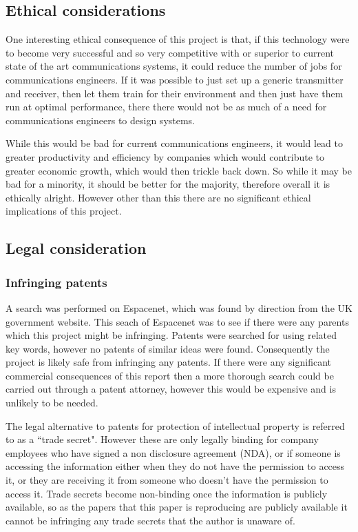 \documentclass[12pt,onecolumn,letterpaper]{article}
\begin{document}
\subsection{Ethical considerations}

One interesting ethical consequence of this project is that, if this technology were to become very successful and so very competitive with or superior to current state of the art communications systems, it could reduce the number of jobs for communications engineers. If it was possible to just set up a generic transmitter and receiver, then let them train for their environment and then just have them run at optimal performance, there there would not be as much of a need for communications engineers to design systems.

While this would be bad for current communications engineers, it would lead to greater productivity and efficiency by companies which would contribute to greater economic growth, which would then trickle back down. So while it may be bad for a minority, it should be better for the majority, therefore overall it is ethically alright. However other than this there are no significant ethical implications of this project.

\subsection{Legal consideration}

\subsubsection{Infringing patents}

A search was performed on Espacenet, which was found by direction from the UK government website. This seach of Espacenet was to see if there were any parents which this project might be infringing. Patents were searched for using related key words, however no patents of similar ideas were found. Consequently the project is likely safe from infringing any patents. If there were any significant commercial consequences of this report then a more thorough search could be carried out through a patent attorney, however this would be expensive and is unlikely to be needed.

The legal alternative to patents for protection of intellectual property is referred to as a ``trade secret". However these are only legally binding for company employees who have signed a non disclosure agreement (NDA), or if someone is accessing the information either when they do not have the permission to access it, or they are receiving it from someone who doesn't have the permission to access it. Trade secrets become non-binding once the information is publicly available, so as the papers that this paper is reproducing are publicly available it cannot be infringing any trade secrets that the author is unaware of. 
\end{document}
